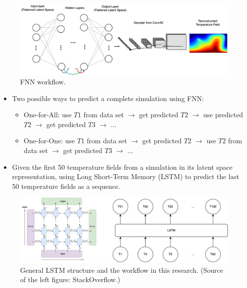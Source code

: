 {\begin{figure}[H]
    \centering
    \includegraphics[width=0.8\linewidth]{figures/FNN_workflow.png}
    \caption{FNN workflow.}
\end{figure}

\begin{itemize}
    \item Two possible ways to predict a complete simulation using FNN:

        \begin{itemize}
            \item One-for-All: use $T1$ from data set $\rightarrow$ get predicted $T2$ $\rightarrow$ use predicted $T2$ $\rightarrow$ get predicted $T3$ $\rightarrow$ ...

            \item One-for-One: use $T1$ from data set $\rightarrow$ get predicted $T2$ $\rightarrow$ use $T2$ from data set $\rightarrow$ get predicted $T3$ $\rightarrow$ ...
        \end{itemize}

    \item Given the first 50 temperature fields from a simulation in its latent space representation, using Long Short-Term Memory (LSTM) to predict the last 50 temperature fields as a sequence.

\end{itemize}

\begin{figure}[H]
    \centering
    \includegraphics[width=0.8\linewidth]{figures/LSTM_workflow.png}
    \caption{General LSTM structure and the workflow in this research. (Source of the left figure: StackOverflow.)}
\end{figure}
}

